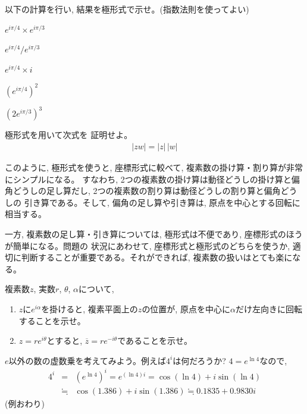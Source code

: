 \begin{q}\label{q:univ_comp_polar2} 以下の計算を行い, 結果を極形式で示せ。(指数法則を使ってよい)
\begin{edaenumerate}
\item $e^{i\pi/4}\times e^{i\pi/3}$
\item $e^{i\pi/4}/e^{i\pi/3}$
\item $e^{i\pi/4}\times i$
\item $(e^{i\pi/4})^2$
\item $(2e^{i\pi/3})^3$
\end{edaenumerate}\end{q}
\vspace{0.3cm}

\begin{q}\label{q:univ_comp_polar_abs} 極形式を用いて次式を
証明せよ。
\begin{eqnarray}|zw|=|z|\,|w|\label{eq:abs_zw_absz_absw}\end{eqnarray}
\end{q}
\vspace{0.3cm}

このように, 極形式を使うと, 座標形式に較べて, 複素数の掛け算・割り算が非常にシンプルになる。
すなわち, 2つの複素数の掛け算は動径どうしの掛け算と偏角どうしの足し算だし, 
2つの複素数の割り算は動径どうしの割り算と偏角どうしの
引き算である。そして, 偏角の足し算や引き算は, 原点を中心とする回転に相当する。

一方, 複素数の足し算・引き算については, 極形式は不便であり, 座標形式のほうが簡単になる。問題の
状況にあわせて, 座標形式と極形式のどちらを使うか, 適切に判断することが重要である。それができれば, 
複素数の扱いはとても楽になる。\\

\begin{q}\label{q:univ_comp_polar4} 複素数$z$, 実数$r$, $\theta$, $\alpha$について,
\begin{enumerate}
\item $z$に$e^{i\alpha}$を掛けると, 複素平面上の$z$の位置が, 原点を中心に$\alpha$だけ左向きに回転することを示せ。
\item $z=re^{i\theta}$とすると, $\overline{z}=re^{-i\theta}$であることを示せ。
\end{enumerate}\end{q}
\mv

\begin{exmpl} $e$以外の数の虚数乗を考えてみよう。例えば$4^i$は何だろうか? $4=e^{\ln 4}$なので, 
\begin{eqnarray*}
4^i&=&(e^{\ln 4})^i=e^{(\ln 4)i}=\cos(\ln 4)+i\sin(\ln 4)\\
   &\fallingdotseq&\cos(1.386)+i\sin(1.386)\fallingdotseq0.1835+0.9830i
\end{eqnarray*}
(例おわり)\end{exmpl}
\hv

